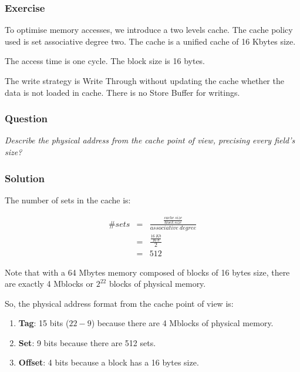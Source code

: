 
\begin{frame}
  \frametitle{Exercise}

  To optimise memory accesses, we introduce a two levels cache. The
  cache policy used is set associative degree two. The cache is a
  unified cache of 16 Kbytes size.

  \-

  The access time is one cycle. The block size is 16 bytes.

  \-

  The write strategy is Write Through without updating the cache whether
  the data is not loaded in cache. There is no Store Buffer for writings.
\end{frame}


\begin{frame}
  \frametitle{Question}

  \textit{Describe the physical address from the cache point of view,
    precising every field's size?}
\end{frame}


\begin{frame}
  \frametitle{Solution}

  The number of sets in the cache is:


  \begin{eqnarray*}
    \# sets & = & \frac{\frac{cache~size}{block~size}}{associative~degree} \\
            & = & \frac{\frac{16~Kb}{16~b}}{2} \\
            & = & 512
  \end{eqnarray*}

  Note that with a 64 Mbytes memory composed of blocks of 16 bytes size,
  there are exactly 4 Mblocks or $2^{22}$ blocks of physical memory.

  \-

  So, the physical address format from the cache point of view is:

  \begin{enumerate}
    \item
      \textbf{Tag}: 15 bits ($22 - 9$) because there are 4 Mblocks of
      physical memory.
    \item
      \textbf{Set}: 9 bits because there are 512 sets.
    \item
      \textbf{Offset}: 4 bits because a block has a 16 bytes size.
  \end{enumerate}
\end{frame}

